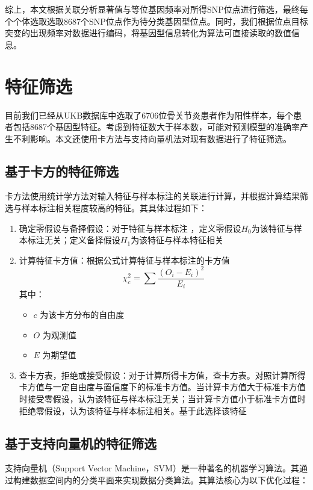 综上，本文根据关联分析显著值与等位基因频率对所得SNP位点进行筛选，最终每个个体选取选取8687个SNP位点作为待分类基因型位点。同时，我们根据位点目标突变的出现频率对数据进行编码，将基因型信息转化为算法可直接读取的数值信息。

\section{特征筛选}
目前我们已经从UKB数据库中选取了6706位骨关节炎患者作为阳性样本，每个患者包括8687个基因型特征。考虑到特征数大于样本数，可能对预测模型的准确率产生不利影响。\cite{janes_optimal_2005}本文还使用卡方法与支持向量机法对现有数据进行了特征筛选。
\subsection{基于卡方的特征筛选}

卡方法使用统计学方法对输入特征与样本标注的关联进行计算，并根据计算结果筛选与样本标注相关程度较高的特征。其具体过程如下：

\begin{enumerate}
\item
  确定零假设与备择假设：对于特征与样本标注
  ，定义零假设$H_0$为该特征与样本标注无关；定义备择假设$H_1$为该特征与样本特征相关
\item
  计算特征卡方值：根据公式计算特征与样本标注的卡方值
    \begin{equation}
        \chi_c^2=\sum \frac{(O_{i}-E_i)^2}{E_i}
    \end{equation}
  其中：

  \begin{itemize}
  \item
    \(c\) 为该卡方分布的自由度
  \item
    \(O\) 为观测值
  \item
    \(E\) 为期望值
  \end{itemize}
\item
  查卡方表，拒绝或接受假设：对于计算所得卡方值，查卡方表。对照计算所得卡方值与一定自由度与置信度下的标准卡方值。当计算卡方值大于标准卡方值时接受零假设，认为该特征与样本标注无关；当计算卡方值小于标准卡方值时拒绝零假设，认为该特征与样本标注相关。基于此选择该特征
\end{enumerate}

\subsection{基于支持向量机的特征筛选}

支持向量机（Support Vector Machine，SVM）是一种著名的机器学习算法。其通过构建数据空间内的分类平面来实现数据分类算法。其算法核心为以下优化过程：

